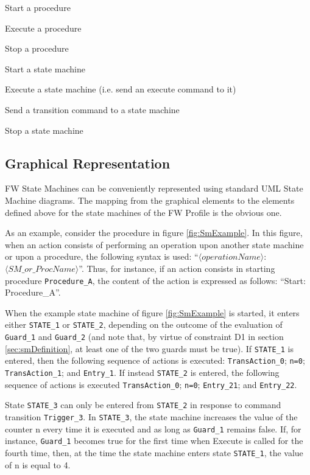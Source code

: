 \documentclass[a4paper,10pt]{article}
\newenvironment{fw_itemize}						%
{\begin{itemize}
  \setlength{\itemsep}{1mm}
  \setlength{\parskip}{0pt}
  \setlength{\parsep}{0pt}}
{\end{itemize}}
\begin{document}
\begin{fw_itemize} 
\item Start a procedure
\item Execute a procedure
\item Stop a procedure
\item Start a state machine
\item Execute a state machine (i.e. send an execute command to it)
\item Send a transition command to a state machine 
\item Stop a state machine 
\end{fw_itemize}

\subsection{Graphical Representation}
FW State Machines can be conveniently represented using standard UML State Machine
diagrams. The mapping from the graphical elements to the elements defined above for the state
machines of the FW Profile is the obvious one.

As an example, consider the procedure in figure \ref{fig:SmExample}. In this figure, when an action consists of performing an operation upon another state machine or upon a
procedure, the following syntax is used: “$\langle operationName \rangle$: $\langle SM\_or\_ProcName \rangle$”. Thus, for
instance, if an action consists in starting procedure \texttt{Procedure\_A}, the content of the action is
expressed as follows: “Start: Procedure\_A”.

When the example state machine of figure \ref{fig:SmExample} is started, it enters either \texttt{STATE\_1} or \texttt{STATE\_2}, depending on the outcome of the evaluation of \texttt{Guard\_1} and \texttt{Guard\_2} (and note that, by virtue of constraint D1 in section \ref{sec:smDefinition}, at least one of the two guards must be true). If \texttt{STATE\_1} is entered, then the following sequence of actions is executed: \texttt{TransAction\_0}; \texttt{n=0}; \texttt{TransAction\_1}; and \texttt{Entry\_1}. If instead \texttt{STATE\_2} is entered, the following sequence of actions is executed \texttt{TransAction\_0}; \texttt{n=0}; \texttt{Entry\_21}; and \texttt{Entry\_22}.

State \texttt{STATE\_3} can only be entered from \texttt{STATE\_2} in response to command transition \texttt{Trigger\_3}. In \texttt{STATE\_3}, the state machine increases the value of the counter n every time it is executed and as long as \texttt{Guard\_1} remains false. If, for instance, \texttt{Guard\_1} becomes true for the first time when Execute is called for the fourth time, then, at the time the state machine enters state \texttt{STATE\_1}, the value of n is equal to 4.
\end{document}
